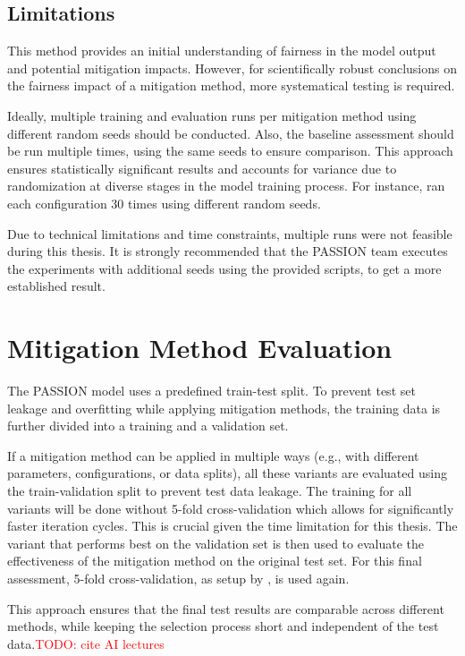 \documentclass[12pt, a4paper, oneside]{book}   	%
\renewcommand{\todo}[1]{\textcolor{red}{TODO: #1}}
\begin{document}
		\subsection{Limitations}
			This method provides an initial understanding of fairness in the model output and potential mitigation impacts. However, for scientifically robust conclusions on the fairness impact of a mitigation method, more systematical testing is required.
			
			Ideally, multiple training and evaluation runs per mitigation method using different random seeds should be conducted. Also, the baseline assessment should be run multiple times, using the same seeds to ensure comparison. This approach ensures statistically significant results and accounts for variance due to randomization at diverse stages in the model training process. For instance, \textcite{Valentim_2019} ran each configuration 30 times using different random seeds.
			
			Due to technical limitations and time constraints, multiple runs were not feasible during this thesis. It is strongly recommended that the PASSION team executes the experiments with additional seeds using the provided scripts, to get a more established result.
		
		\section{Mitigation Method Evaluation} \label{chap:mitigationMethodsApplyMethod}
		The PASSION model uses a predefined train-test split. To prevent test set leakage and overfitting while applying mitigation methods, the training data is further divided into a training and a validation set. 
		
		If a mitigation method can be applied in multiple ways (e.g., with different parameters, configurations, or data splits), all these variants are evaluated using the train-validation split to prevent test data leakage. The training for all variants will be done without 5-fold cross-validation which allows for significantly faster iteration cycles. This is crucial given the time limitation for this thesis. The variant that performs best on the validation set is then used to evaluate the effectiveness of the mitigation method on the original test set. For this final assessment, 5-fold cross-validation, as setup by \textcite{Gottfrois2024}, is used again.
		
		This approach ensures that the final test results are comparable across different methods, while keeping the selection process short and independent of the test data.\todo{cite AI lectures}

		
\end{document}
